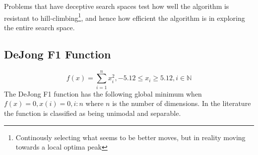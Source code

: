 Problems that have deceptive search spaces test how well the algorithm is resistant to hill-climbing\footnote{Continously selecting what seems to be better moves, but in reality  moving towards a local optima peak}, and hence how efficient the algorithm is in exploring the entire search space\cite{evalevoalgo}.
\subsection{DeJong F1 Function}
\begin{equation}
\label{eq:DeJongF1}
	f(x) = \sum_{i=1}^n x^2_i, -5.12 \leq x_i \geq 5.12, i \in \mathbb{N}
\end{equation}
The DeJong F1 function has the following global minimum when $f(x) = 0, x(i) = 0, i:n$ where $n$ is the number of dimensions\cite{numericalABC,ABCCompareStudy,ARPSO,PerfABC,ContinACSTS,TestFunctions}. In the literature the function is classified as being unimodal and separable\cite{ABCCompareStudy,TestFunctions}. 

